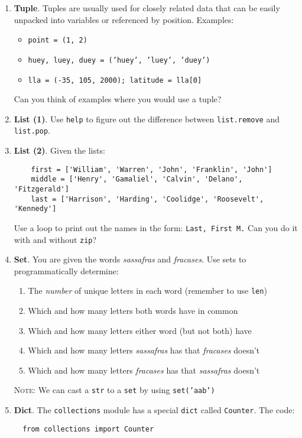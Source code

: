 \documentclass{article}
\begin{document}
  
  \begin{enumerate}
  \item \textbf{Tuple}. Tuples are usually used for closely related
  data that can be easily unpacked into variables or referenced by
  position. Examples:
  \begin{itemize}
    \item \texttt{point = (1, 2)}
    \item \texttt{huey, luey, duey = ('huey', 'luey', 'duey')}
    \item \texttt{lla = (-35, 105, 2000); latitude = lla[0]}
  \end{itemize}
  Can you think of examples where you would use a tuple?

  \item \textbf{List (1)}. Use \texttt{help} to figure out the difference between
  \texttt{list.remove} and \texttt{list.pop}.

  \item \textbf{List (2)}. Given the lists:
  \begin{verbatim}
    first = ['William', 'Warren', 'John', 'Franklin', 'John']
    middle = ['Henry', 'Gamaliel', 'Calvin', 'Delano', 'Fitzgerald']
    last = ['Harrison', 'Harding', 'Coolidge', 'Roosevelt', 'Kennedy']
  \end{verbatim}
  Use a loop to print out the names in the form: \texttt{Last, First M.}
  Can you do it with and without \texttt{zip}? 

  \item \textbf{Set}. You are given the words \textit{sassafras}
  and \textit{fracases}. Use sets to programmatically determine:
  \begin{enumerate}
    \item The \textit{number} of unique letters in each word (remember to use \texttt{len})
    \item Which and how many letters both words have in common 
    \item Which and how many letters either word (but not both) have
    \item Which and how many letters \textit{sassafras} has that \textit{fracases} doesn't
    \item Which and how many letters \textit{fracases} has that \textit{sassafras} doesn't
  \end{enumerate}
  \textsc{Note}: We can cast a \texttt{str} to a \texttt{set} by using \texttt{set('aab')}

  \item \textbf{Dict}. The \texttt{collections} module has a special \texttt{dict}
  called \texttt{Counter}. The code:
  \begin{verbatim}
  from collections import Counter


\end{verbatim}
\end{enumerate}
\end{document}
